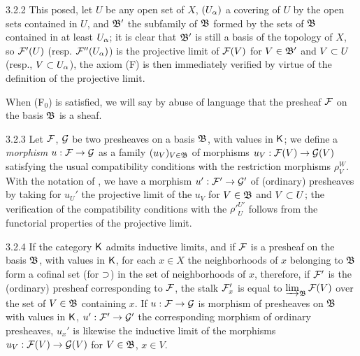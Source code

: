 \documentclass[../main.tex]{subfiles}
\begin{document}
\begin{env}{3.2.2}
This posed, let $U$ be any open set of $X$, $(U_\alpha)$ a covering of $U$ by
the open sets contained in $U$, and $\mathfrak{B}'$ the subfamily of $\mathfrak{B}$ formed by the sets
of $\mathfrak{B}$ contained in at least $U_\alpha$; it is clear that $\mathfrak{B}'$ is still a basis
of the topology of $X$, so $\mathcal{F}'(U)$ (resp. $\mathcal{F}''(U_\alpha)$) is the projective limit of $\mathcal{F}(V)$ for $V\in\mathfrak{B}'$
and $V\subset U$ (resp., $V\subset U_\alpha$), the axiom (F) is then immediately verified by virtue of the definition of the
projective limit.

When (F$_0$) is satisfied, we will say by abuse of language that the presheaf $\mathcal{F}$ on the basis $\mathfrak{B}$ is a sheaf.
\end{env}

\begin{env}{3.2.3}
Let $\mathcal{F}$, $\mathcal{G}$ be two presheaves on a basis $\mathfrak{B}$, with values in $\mathsf{K}$; we define a \emph{morphism}
$u:\mathcal{F}\to\mathcal{G}$ as a family $(u_V)_{V\in\mathfrak{B}}$ of morphisms $u_V:\mathcal{F}(V)\to\mathcal{G}(V)$ satisfying the usual
compatibility conditions with the restriction morphisms $\rho_V^W$. With the notation of ,
we have a morphism $u':\mathcal{F}'\to\mathcal{G}'$ of (ordinary) presheaves by taking for $u_U'$ the projective limit
of the $u_V$ for $V\in\mathfrak{B}$ and $V\subset U$; the verification of the compatibility conditions with
the ${\rho'}_U^{U'}$ follows from the functorial properties of the projective limit.
\end{env}

\begin{env}{3.2.4}
If the category $\mathsf{K}$ admits inductive limits, and if $\mathcal{F}$ is a presheaf on the basis $\mathfrak{B}$, with
values in $\mathsf{K}$, for each $x\in X$ the neighborhoods of $x$ belonging to $\mathfrak{B}$ form a cofinal set
(for $\supset$) in the set of neighborhoods of $x$, therefore, if $\mathcal{F}'$ is the (ordinary) presheaf
corresponding to $\mathcal{F}$, the stalk $\mathcal{F}_x'$ is equal to $\varinjlim_{\mathfrak{B}}\mathcal{F}(V)$ over the set of
$V\in\mathfrak{B}$ containing $x$. If $u:\mathcal{F}\to\mathcal{G}$ is morphism of presheaves on $\mathfrak{B}$ with values in
$\mathsf{K}$, $u':\mathcal{F}'\to\mathcal{G}'$ the corresponding morphism of ordinary presheaves, $u_x'$ is likewise the
inductive limit of the morphisms $u_V:\mathcal{F}(V)\to\mathcal{G}(V)$ for $V\in\mathfrak{B}$, $x\in V$.
\end{env}
\end{document}
